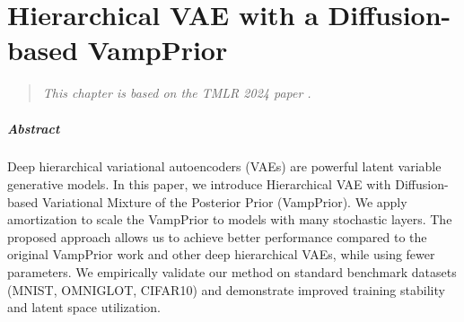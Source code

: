 





\chapter{Hierarchical VAE with a Diffusion-based VampPrior}\label{chap:dvp}


\begin{verse}
\textit{
\hfill This chapter is based on the TMLR 2024 paper \citep{kuzina2024hierarchical}.
} 
\end{verse}

\paragraph{Abstract}
Deep hierarchical variational autoencoders (VAEs) are powerful latent variable generative models. 
In this paper, we introduce Hierarchical VAE with Diffusion-based Variational Mixture of the Posterior Prior (VampPrior).
We apply amortization to scale the VampPrior to models with many stochastic layers. 
The proposed approach allows us to  achieve better performance compared to the original VampPrior work and other deep hierarchical VAEs, while using fewer parameters.
We empirically validate our method on standard benchmark datasets (MNIST, OMNIGLOT, CIFAR10) and demonstrate improved training stability and latent space utilization.
\newpage





% 







